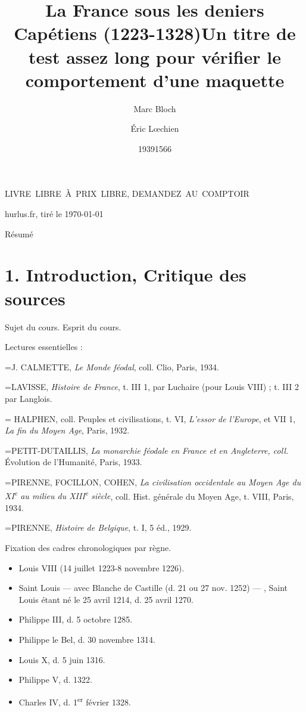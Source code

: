 \documentclass[french,twoside]{book} %
\title{{\bf La France sous les deniers Capétiens (1223-1328)}}
\date{1939}
\author{Marc Bloch}
\author{Éric Lœchien}
\title{Un titre de test assez long pour vérifier le comportement d’une maquette}
\date{1566}
\makeatletter
\newif\ifdev
\newcommand{\elabstract}{Résumé\par}
\let\eltitle\@title
\let\elauthor\@author
\let\eldate\@date
\renewcommand{\LettrineFontHook}{\color{rubric}}
\newcommand{\initialiv}[2]{%
  \let\oldLFH\LettrineFontHook
  \IfSubStr{Q}{#1}{
    \lettrine[lines=4, lhang=0.2, loversize=-0.1, lraise=0.2]{\smash{#1}}{#2}
  }{\IfSubStr{É}{#1}{
    \lettrine[lines=4, lhang=0.2, loversize=-0, lraise=0]{\smash{#1}}{#2}
  }{\IfSubStr{ÀÂ}{#1}{
    \lettrine[lines=4, lhang=0.2, loversize=-0, lraise=0, slope=0.6em]{\smash{#1}}{#2}
  }{\IfSubStr{A}{#1}{
    \lettrine[lines=4, lhang=0.2, loversize=0.2, slope=0.6em]{\smash{#1}}{#2}
  }{\IfSubStr{V}{#1}{
    \lettrine[lines=4, lhang=0.2, loversize=0.2, slope=-0.5em]{\smash{#1}}{#2}
  }{
    \lettrine[lines=4, lhang=0.2, loversize=0.2]{\smash{#1}}{#2}
  }}}}}
  \let\LettrineFontHook\oldLFH
}
\newcommand{\biblitem}[1]{{\noindent\hangindent=\parindent   #1\par}}
\newcommand\chapteropen{} %
\newcommand\chaptercont{} %
\renewcommand{\LettrineFontHook}{\bfseries\color{rubric}}
\newcommand\chapo{{%
  \vspace*{-3em}
  \centering %
  {\Large\addfontfeature{LetterSpace=25}\bfseries{\elauthor}}\par
  \smallskip
  {\large\eldate}\par
  \bigskip
  {\Large\selectfont{\eltitle}}\par
  \bigskip
  {\color{rubric}\hline\par}
  \bigskip
  {\Large LIVRE LIBRE À PRIX LIBRE, DEMANDEZ AU COMPTOIR\par}
  \centerline{\small\color{rubric} {hurlus.fr, tiré le \today}}\par
  \bigskip
}}
\makeatother
\begin{document}
\pagestyle{fancy}
\thispagestyle{empty}


\ifaiv
  \twocolumn[\chapo]
\else
  \chapo
\fi


\elabstract
\bigskip

\makeatletter{}\makeatother %

\ifdev %

\fontname\font — \textsc{Les règles du jeu}\par
(\hyperref[utopie]{\underline{Lien}})\par
\noindent \initialiv{A}{lors là}\blindtext\par
\noindent \initialiv{À}{ la bonheur des dames}\blindtext\par
\noindent \initialiv{É}{tonnez-le}\blindtext\par
\noindent \initialiv{Q}{ualitativement}\blindtext\par
\noindent \initialiv{V}{aloriser}\blindtext\par
\Blindtext
\phantomsection
\label{utopie}
\Blinddocument
\fi


\chapteropen
\chapter[1. Introduction, Critique des sources]{\textsc{1. }Introduction, Critique des sources}
\label{c01}

\chaptercont
\noindent Sujet du cours. Esprit du cours.\par
Lectures essentielles :\par
\biblitem{J. CALMETTE, {\itshape Le Monde féodal}, coll. Clio, Paris, 1934.}
\biblitem{LAVISSE, {\itshape Histoire de France}, t. III 1, par Luchaire (pour Louis VIII) ; t. III 2 par Langlois.}
\biblitem{ HALPHEN, coll. Peuples et civilisations, t. VI, {\itshape L’essor de l’Europe}, et VII 1, {\itshape La fin du Moyen Age}, Paris, 1932.}
\biblitem{PETIT-DUTAILLIS, {\itshape La monarchie féodale en France et en Angleterre, coll.} Évolution de l’Humanité, Paris, 1933.}
\biblitem{PIRENNE, FOCILLON, COHEN, {\itshape La civilisation occidentale au Moyen Age du XI\textsuperscript{e} au milieu du XIII\textsuperscript{e} siècle}, coll. Hist. générale du Moyen Age, t. VIII, Paris, 1934.}
\biblitem{PIRENNE, {\itshape Histoire de Belgique}, t. I, 5 éd., 1929.}
\noindent Fixation des cadres chronologiques par règne.\par

\begin{itemize}[itemsep=0pt,]
\item Louis VIII (14 juillet 1223-8 novembre 1226).
\item Saint Louis — avec Blanche de Castille (d. 21 ou 27 nov. 1252) — , Saint Louis étant né le 25 avril 1214, d. 25 avril 1270.
\item Philippe III, d. 5 octobre 1285.
\item Philippe le Bel, d. 30 novembre 1314.
\item Louis X, d. 5 juin 1316.
\item Philippe V, d. 1322.
\item Charles IV, d. 1\textsuperscript{er} février 1328.
\end{itemize}
\end{document}
